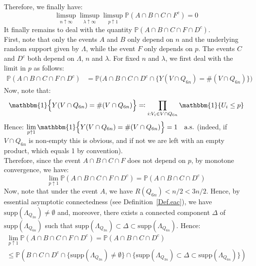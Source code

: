 \documentclass[10pt,a4paper]{amsart}
\theoremstyle{exampstyle}
\theoremstyle{exampnotations}
\begin{document}
Therefore, we finally have:
\begin{equation}
    \label{eq20}
    \limsup_{n \uparrow \infty} \limsup_{\lambda \uparrow \infty} \limsup_{p \uparrow 1} \mathbb{P}(A \cap B \cap C \cap F^c)=0
\end{equation}
It finally remains to deal with the quantity $\mathbb{P}(A \cap B \cap C \cap F \cap D^{c})$. \\
First, note that only the events $A$ and $B$ only depend on $n$ and the underlying random support given by $\Lambda$, while the event $F$ only depends on $p$. The events $C$ and $D^c$ both depend on $\Lambda$, $n$ and $\lambda$. For fixed $n$ and $\lambda$, we first deal with the limit in $p$ as follows:
\begin{align*}
    \mathbb{P}(A \cap B \cap C \cap F \cap D^c) &= \mathbb{P}\Big(A \cap B \cap C \cap D^c \cap \lbrace Y(V \cap Q_{6n}) = \#(V \cap Q_{6n}) \rbrace \Big)
\end{align*}
Now, note that:
\begin{equation*}
    \mathbbm{1}\Big\lbrace Y(V \cap Q_{6n}) = \#(V \cap Q_{6n}) \Big\rbrace \eqqcolon \prod_{i : V_i \in V \cap Q_{6n}} \mathbbm{1} \lbrace U_i \leq p \rbrace
\end{equation*}
Hence: $\displaystyle \lim_{p \uparrow 1} \mathbbm{1}\Big\lbrace Y(V \cap Q_{6n}) = \#(V \cap Q_{6n}) \Big\rbrace = 1 \quad \text{a.s.}$ (indeed, if $V\cap Q_{6n}$ is non-empty this is obvious, and if not we are left with an empty product, which equals 1 by convention). \\
Therefore, since the event $A \cap B \cap C \cap F$ does not depend on $p$, by monotone convergence, we have:
\begin{equation*}
\lim_{p \uparrow 1} \mathbb{P}(A \cap B \cap C \cap F \cap D^{c}) = \mathbb{P}(A \cap B \cap C \cap D^c) 
\end{equation*}
Now, note that under the event $A$, we have $R(Q_{6n}) < n/2 < 3n/2$. Hence, by essential asymptotic connectedness (see Definition~\ref{Def.eac}), we have $\text{supp}(\Lambda_{Q_{3n}}) \neq \emptyset$ and, moreover, there exists a connected component $\Delta$ of $\text{supp}(\Lambda_{Q_{6n}})$ such that $\text{supp}(\Lambda_{Q_{3n}}) \subset \Delta \subset \text{supp}(\Lambda_{Q_{6n}})$. Hence:
\begin{gather*}
    \lim_{p \uparrow 1} \mathbb{P}(A \cap B \cap C \cap F \cap D^{c})  = \mathbb{P}(A \cap B \cap C \cap D^c)  \\ \leq \mathbb{P}\left(B \cap C \cap D^c \cap \Big\lbrace \text{supp}(\Lambda_{Q_{3n}}) \neq \emptyset \Big\rbrace \cap \Big\lbrace \text{supp}(\Lambda_{Q_{3n}}) \subset \Delta \subset \text{supp}(\Lambda_{Q_{6n}}) \Big\rbrace \right)
\end{gather*}
\end{document}
